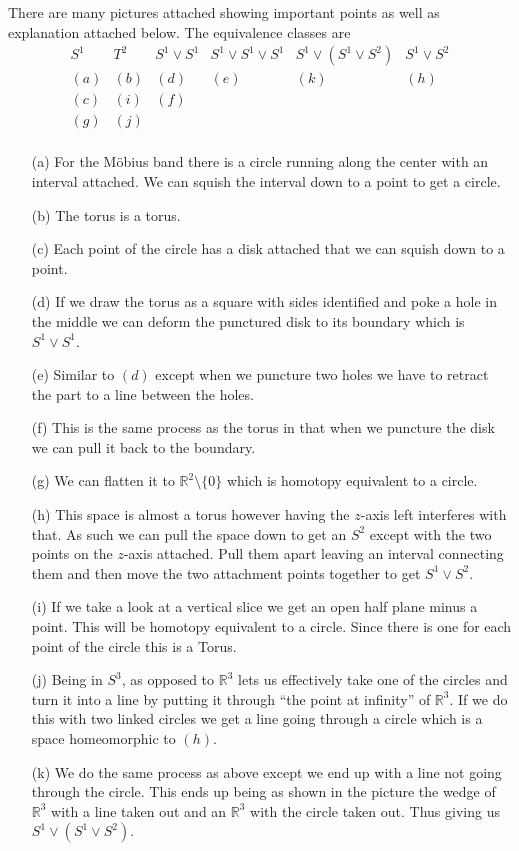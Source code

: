 \documentclass[10pt]{article}
\newcommand{\bb}[1]{\mathbb{#1}}
\theoremstyle{plain}
\theoremstyle{remark}
\begin{document}
There are many pictures attached showing important points as well as
explanation attached below. The equivalence classes are
\[
  \begin{array}{c|c|c|c|c|c}
    S^1&T^2&S^1\vee S^1&S^1\vee S^1 \vee S^1& S^1\vee (S^1\vee S^2)& S^1\vee S^2\\
    \hline
    (a)&(b)&(d)&(e)&(k)&(h)\\
    (c)&(i)&(f)&&&\\
    (g)&(j)&&&&\\
  \end{array}
\]

\begin{itemize}
\item[(a)] For the M\"obius band there is a circle running along the center with
  an interval attached. We can squish the interval down to a point to get a circle.
\item[(b)] The torus is a torus.
\item[(c)] Each point of the circle has a disk attached that we can squish down to a
  point.
\item[(d)] If we draw the torus as a square with sides identified and poke a hole
  in the middle we can deform the punctured disk to its boundary which is
  $S^1\vee S^1$.
\item[(e)] Similar to $(d)$ except when we puncture two holes we have to retract the
  part to a line between the holes.
\item[(f)] This is the same process as the torus in that when we puncture the
  disk we can pull it back to the boundary.
\item[(g)] We can flatten it to $\bb{R}^2\setminus\{0\}$ which is homotopy equivalent to a
  circle.
\item[(h)] This space is almost a torus however having the $z$-axis left interferes
  with that. As such we can pull the space down to get an $S^2$ except with
  the two points on the $z$-axis attached. Pull them apart leaving an interval
  connecting them and then move the two attachment points together to get
  $S^1\vee S^2$.
\item[(i)] If we take a look at a vertical slice we get an open half plane
  minus a point. This will be homotopy equivalent to a circle. Since there
  is one for each point of the circle this is a Torus.
\item[(j)] Being in $S^3$, as opposed to $\bb{R}^3$ lets us effectively take one
  of the circles and turn it into a line by putting it through ``the point at
  infinity'' of $\bb{R}^3$. If we do this with two linked circles we get a line
  going through a circle which is a space homeomorphic to $(h)$.
\item[(k)] We do the same process as above except we end up with a line not
  going through the circle. This ends up being as shown in the picture
  the wedge of $\bb{R}^3$ with a line taken out and an $\bb{R}^3$ with the circle
  taken out. Thus giving us $S^1\vee (S^1\vee S^2)$.
\end{itemize}
\end{document}
